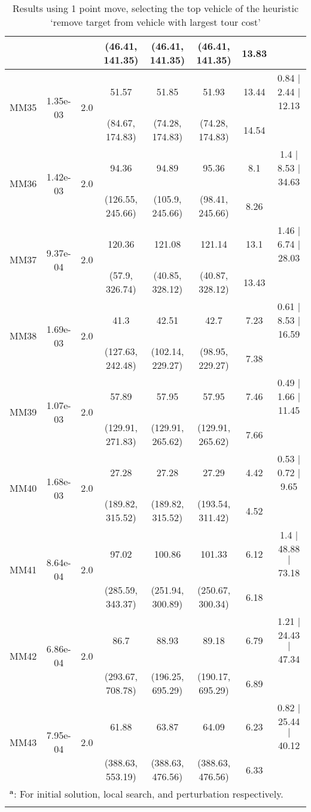\begin{longtable}{|c|c|c|c|c|c|c|c|}
	 &  &  & (46.41, 141.35) & (46.41, 141.35) & (46.41, 141.35) & 13.83 & \\
 	\hline
	\multirow{2}{*}{MM35} & \multirow{2}{*}{1.35e-03} & \multirow{2}{*}{2.0} & 51.57 & 51.85 & 51.93 & 13.44 & 0.84 $\mid$ 2.44 $\mid$ 12.13\\
	 &  &  & (84.67, 174.83) & (74.28, 174.83) & (74.28, 174.83) & 14.54 & \\
 	\hline
	\multirow{2}{*}{MM36} & \multirow{2}{*}{1.42e-03} & \multirow{2}{*}{2.0} & 94.36 & 94.89 & 95.36 & 8.1 & 1.4 $\mid$ 8.53 $\mid$ 34.63\\
	 &  &  & (126.55, 245.66) & (105.9, 245.66) & (98.41, 245.66) & 8.26 & \\
 	\hline
	\multirow{2}{*}{MM37} & \multirow{2}{*}{9.37e-04} & \multirow{2}{*}{2.0} & 120.36 & 121.08 & 121.14 & 13.1 & 1.46 $\mid$ 6.74 $\mid$ 28.03\\
	 &  &  & (57.9, 326.74) & (40.85, 328.12) & (40.87, 328.12) & 13.43 & \\
 	\hline
	\multirow{2}{*}{MM38} & \multirow{2}{*}{1.69e-03} & \multirow{2}{*}{2.0} & 41.3 & 42.51 & 42.7 & 7.23 & 0.61 $\mid$ 8.53 $\mid$ 16.59\\
	 &  &  & (127.63, 242.48) & (102.14, 229.27) & (98.95, 229.27) & 7.38 & \\
 	\hline
	\multirow{2}{*}{MM39} & \multirow{2}{*}{1.07e-03} & \multirow{2}{*}{2.0} & 57.89 & 57.95 & 57.95 & 7.46 & 0.49 $\mid$ 1.66 $\mid$ 11.45\\
	 &  &  & (129.91, 271.83) & (129.91, 265.62) & (129.91, 265.62) & 7.66 & \\
 	\hline
	\multirow{2}{*}{MM40} & \multirow{2}{*}{1.68e-03} & \multirow{2}{*}{2.0} & 27.28 & 27.28 & 27.29 & 4.42 & 0.53 $\mid$ 0.72 $\mid$ 9.65\\
	 &  &  & (189.82, 315.52) & (189.82, 315.52) & (193.54, 311.42) & 4.52 & \\
 	\hline
	\multirow{2}{*}{MM41} & \multirow{2}{*}{8.64e-04} & \multirow{2}{*}{2.0} & 97.02 & 100.86 & 101.33 & 6.12 & 1.4 $\mid$ 48.88 $\mid$ 73.18\\
	 &  &  & (285.59, 343.37) & (251.94, 300.89) & (250.67, 300.34) & 6.18 & \\
 	\hline
	\multirow{2}{*}{MM42} & \multirow{2}{*}{6.86e-04} & \multirow{2}{*}{2.0} & 86.7 & 88.93 & 89.18 & 6.79 & 1.21 $\mid$ 24.43 $\mid$ 47.34\\
	 &  &  & (293.67, 708.78) & (196.25, 695.29) & (190.17, 695.29) & 6.89 & \\
 	\hline
	\multirow{2}{*}{MM43} & \multirow{2}{*}{7.95e-04} & \multirow{2}{*}{2.0} & 61.88 & 63.87 & 64.09 & 6.23 & 0.82 $\mid$ 25.44 $\mid$ 40.12\\
	 &  &  & (388.63, 553.19) & (388.63, 476.56) & (388.63, 476.56) & 6.33 & \\
 	\hline
	\multicolumn{8}{l}{$^{\mathrm{\boldsymbol{a}}}$: For initial solution, local search, and perturbation respectively.}\\

\caption{Results using 1 point move, selecting the top vehicle of the heuristic \lq remove target from vehicle with largest tour cost\rq }
\end{longtable}
